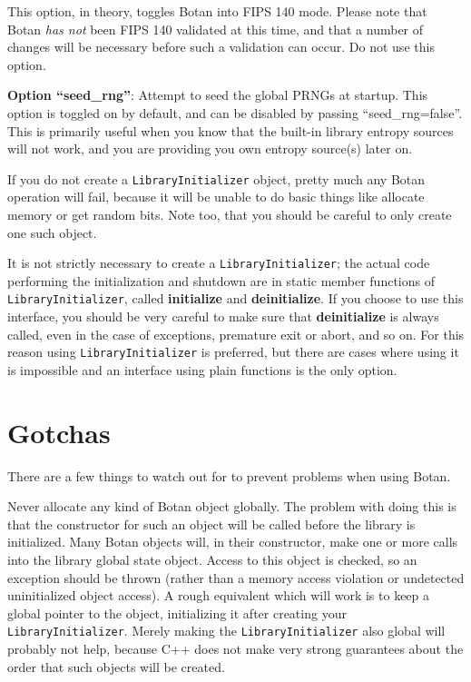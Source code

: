 \documentclass{article}
\newcommand{\function}[1]{\textbf{#1}}
\newcommand{\type}[1]{\texttt{#1}}
\begin{document}
This option, in theory, toggles Botan into FIPS
140 mode. Please note that Botan \emph{has not} been FIPS 140 validated at this
time, and that a number of changes will be necessary before such a validation
can occur. Do not use this option.

\noindent
\textbf{Option ``seed\_rng''}: Attempt to seed the global PRNGs at
startup. This option is toggled on by default, and can be disabled by passing
``seed\_rng=false''. This is primarily useful when you know that the built-in
library entropy sources will not work, and you are providing you own entropy
source(s) later on.

If you do not create a \type{LibraryInitializer} object, pretty much
any Botan operation will fail, because it will be unable to do basic
things like allocate memory or get random bits. Note too, that you
should be careful to only create one such object.

It is not strictly necessary to create a \type{LibraryInitializer};
the actual code performing the initialization and shutdown are in
static member functions of \type{LibraryInitializer}, called
\function{initialize} and \function{deinitialize}. If you choose to
use this interface, you should be very careful to make sure that
\function{deinitialize} is always called, even in the case of
exceptions, premature exit or abort, and so on. For this reason using
\type{LibraryInitializer} is preferred, but there are cases where
using it is impossible and an interface using plain functions is the
only option.

\pagebreak

\section{Gotchas}

There are a few things to watch out for to prevent problems when using Botan.

Never allocate any kind of Botan object globally. The problem with doing this
is that the constructor for such an object will be called before the library is
initialized. Many Botan objects will, in their constructor, make one or more
calls into the library global state object. Access to this object is checked,
so an exception should be thrown (rather than a memory access violation or
undetected uninitialized object access). A rough equivalent which will work is
to keep a global pointer to the object, initializing it after creating your
\type{LibraryInitializer}. Merely making the \type{LibraryInitializer} also
global will probably not help, because C++ does not make very strong guarantees
about the order that such objects will be created.
\end{document}

